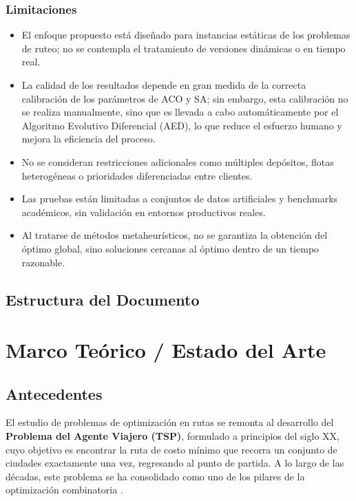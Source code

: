 \documentclass[12pt,titlepage,twoside,openright]{book}
\begin{document}
\subsection*{Limitaciones}

\begin{itemize}
	\item El enfoque propuesto está diseñado para instancias estáticas de los problemas de ruteo; no se contempla el tratamiento de versiones dinámicas o en tiempo real.

	\item La calidad de los resultados depende en gran medida de la correcta calibración de los parámetros de ACO y SA; sin embargo, esta calibración no se realiza manualmente, sino que es llevada a cabo automáticamente por el Algoritmo Evolutivo Diferencial (AED), lo que reduce el esfuerzo humano y mejora la eficiencia del proceso.

	\item No se consideran restricciones adicionales como múltiples depósitos, flotas heterogéneas o prioridades diferenciadas entre clientes.

	\item Las pruebas están limitadas a conjuntos de datos artificiales y benchmarks académicos, sin validación en entornos productivos reales.

	\item Al tratarse de métodos metaheurísticos, no se garantiza la obtención del óptimo global, sino soluciones cercanas al óptimo dentro de un tiempo razonable.
\end{itemize}

\section{Estructura del Documento}

\chapter{Marco Teórico / Estado del Arte}
\label{cap:marco-teorico}
\section{Antecedentes}

El estudio de problemas de optimización en rutas se remonta al desarrollo del \textbf{Problema del Agente Viajero (TSP)}, formulado a principios del siglo XX, cuyo objetivo es encontrar la ruta de costo mínimo que recorra un conjunto de ciudades exactamente una vez, regresando al punto de partida. A lo largo de las décadas, este problema se ha consolidado como uno de los pilares de la optimización combinatoria \citep{papadimitriou1994}.
\end{document}
